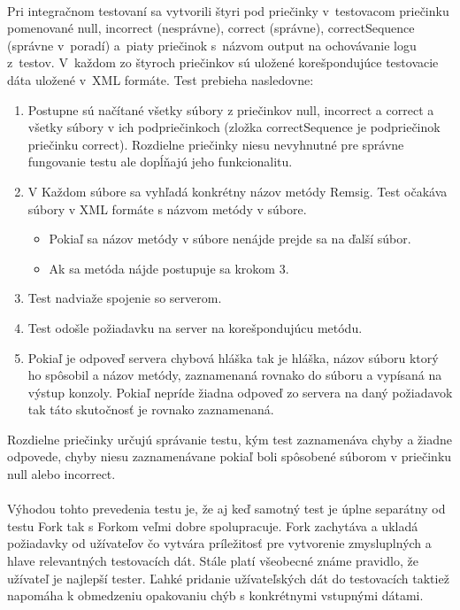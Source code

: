\documentclass[
  digital, %
  table,   %
oneside,
  nolof,     %
  nolot,     %
]{fithesis3}
\begin{document}
 \paragraph{}
Pri integračnom testovaní sa  vytvorili štyri pod priečinky  v~testovacom priečinku pomenované null, incorrect (nesprávne), correct (správne), correctSequence (správne v~poradí) a~piaty priečinok s~názvom output na ochovávanie logu z~testov. V~každom zo štyroch priečinkov sú uložené korešpondujúce testovacie dáta uložené v~XML formáte. Test prebieha nasledovne: 
\begin{enumerate}
	\item Postupne sú načítané všetky súbory z priečinkov null, incorrect a correct a všetky súbory v ich podpriečinkoch (zložka correctSequence je podpriečinok priečinku correct). Rozdielne priečinky niesu nevyhnutné pre správne fungovanie testu ale dopĺňajú jeho funkcionalitu. 
	\item V Každom súbore sa vyhľadá konkrétny názov metódy Remsig. Test očakáva súbory v XML formáte s názvom metódy v súbore.
	\begin{itemize}
		\item Pokiaľ sa názov metódy v súbore nenájde prejde sa na ďalší súbor.
		\item Ak sa metóda nájde postupuje sa krokom 3.
	\end{itemize}
	\item Test nadviaže spojenie so serverom.
	\item Test odošle požiadavku na server na korešpondujúcu metódu.
	\item Pokiaľ je odpoveď servera chybová hláška  tak je hláška, názov súboru ktorý ho spôsobil a názov metódy, zaznamenaná rovnako do súboru a vypísaná na výstup konzoly. Pokiaľ nepríde žiadna odpoveď zo servera na daný požiadavok tak táto skutočnosť je rovnako zaznamenaná.  

\end{enumerate}
Rozdielne priečinky určujú správanie testu, kým test zaznamenáva chyby a žiadne odpovede, chyby niesu zaznamenávane pokiaľ boli spôsobené súborom v priečinku null alebo incorrect.
\paragraph{}
Výhodou tohto prevedenia testu je, že aj keď samotný test je úplne separátny od testu Fork tak s Forkom veľmi dobre spolupracuje. Fork zachytáva a ukladá požiadavky od užívateľov čo vytvára príležitosť pre vytvorenie zmysluplných a hlave relevantných testovacích dát. Stále platí všeobecné známe pravidlo, že užívateľ je najlepší tester. Ľahké pridanie užívateľských dát do testovacích taktiež napomáha k obmedzeniu opakovaniu chýb s konkrétnymi vstupnými dátami.      
\end{document}
